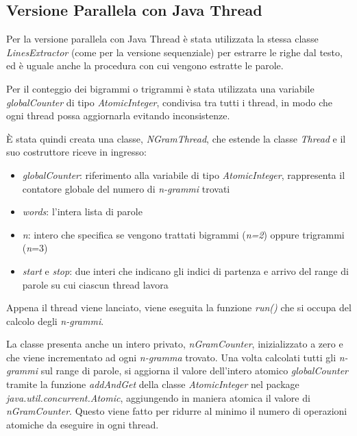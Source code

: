 \documentclass[10pt,twocolumn,letterpaper]{article}
\begin{document}
\subsection{Versione Parallela con Java Thread}
Per la versione parallela con Java Thread è stata utilizzata la stessa classe \textit{LinesExtractor} (come per la versione sequenziale) per estrarre le righe dal testo, ed è uguale anche la procedura con cui vengono estratte le parole.

Per il conteggio dei bigrammi o trigrammi è stata utilizzata una variabile  \textit{globalCounter} di tipo \textit{AtomicInteger}, condivisa tra tutti i thread, in modo che ogni thread possa aggiornarla evitando inconsistenze.

È stata quindi creata una classe, \textit{NGramThread}, che estende la classe \textit{Thread} e il suo costruttore riceve in ingresso:
\begin{itemize}
	\item \textit{globalCounter}: riferimento alla variabile di tipo \textit{AtomicInteger}, rappresenta il contatore globale del numero di \textit{n-grammi} trovati
	\item \textit{words}: l'intera lista di parole
	\item \textit{n}: intero che specifica se vengono trattati bigrammi (\textit{n=2}) oppure trigrammi (\textit{n}=3)
	\item \textit{start} e \textit{stop}: due interi che indicano gli indici di partenza e arrivo del range di parole su cui ciascun thread lavora
\end{itemize}

Appena il thread viene lanciato, viene eseguita la funzione \textit{run()} che si occupa del calcolo degli \textit{n-grammi}.

La classe presenta anche un intero privato, \textit{nGramCounter}, inizializzato a zero e che viene incrementato ad ogni \textit{n-gramma} trovato. Una volta calcolati tutti gli \textit{n-grammi} sul range di parole, si aggiorna il valore dell'intero atomico \textit{globalCounter} tramite la funzione \textit{addAndGet} della classe \textit{AtomicInteger} nel package \textit{java.util.concurrent.Atomic}, aggiungendo in maniera atomica il valore di \textit{nGramCounter}. Questo viene fatto per ridurre al minimo il numero di operazioni atomiche da eseguire in ogni thread.\newline
\end{document}
